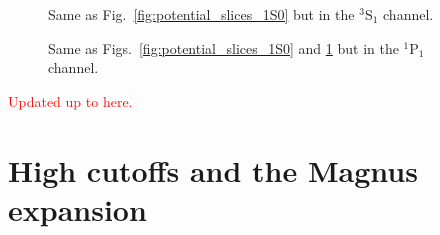 \documentclass[preprintnumbers,floatfix,aps,prc,preprint,nofootinbib]{revtex4-1}
\begin{document}
%
\begin{figure}[H]
	\centering
	
	\caption{Same as Fig.~\ref{fig:potential_slices_1S0} but in the $^3$S$_1$ channel.}
	\label{fig:potential_slices_3S1}
\end{figure}
%
\begin{figure}[H]
	\centering
	
	\caption{Same as Figs.~\ref{fig:potential_slices_1S0} and \ref{fig:potential_slices_3S1} but in the $^1$P$_1$ channel.}
	\label{fig:potential_slices_1P1}
\end{figure}
%
\textcolor{red}{Updated up to here.}


\section{High cutoffs and the Magnus expansion}
\label{sec:high_cutoffs_magnus_exp}
\end{document}
